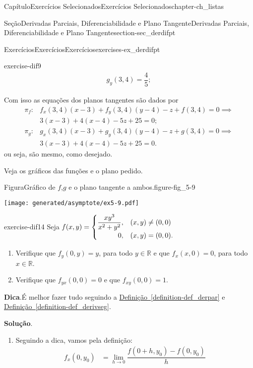 \documentclass[oneside,10pt,]{book}
\newcommand{\blocktitlefont}{\relax}
\newcommand{\xreffont}{\relax}
\numberwithin{equation}{section}
\newcommand{\R}{\mathbb R}
\begin{document}
\begin{chapterptx}{Capítulo}{Exercícios Selecionados}{}{Exercícios Selecionados}{}{}{chapter-ch_listas}
\begin{sectionptx}{Seção}{Derivadas Parciais, Diferenciabilidade e Plano Tangente}{}{Derivadas Parciais, Diferenciabilidade e Plano Tangente}{}{}{section-sec_derdifpt}
\begin{exercises-subsection-numberless}{Exercícios}{Exercícios}{}{Exercícios}{}{}{exercises-ex_derdifpt}
\begin{divisionexercise}{9}{}{}{exercise-dif9}
\begin{align*}
g_y(3,4)=\dfrac{4}{5};
\end{align*}
%
\par
Com isso as equações dos planos tangentes são dados por%
\begin{align*}
\pi_f\colon&
f_x(3,4)(x-3)+f_y(3,4)(y-4)-z+f(3,4)=0\implies\\
&\boxed{3(x-3)+4(x-4)-5z+25=0};\\
\pi_g\colon&
g_x(3,4)(x-3)+g_y(3,4)(y-4)-z+g(3,4)=0\implies\\
&\boxed{3(x-3)+4(x-4)-5z+25=0}.
\end{align*}
ou seja, são mesmo, como desejado.%
\par
Veja os gráficos das funções e o plano pedido. \begin{figureptx}{Figura}{Gráfico de \(f\),\(g\) e o plano tangente a ambos.}{figure-fig_5-9}{}%
\begin{image}{0.25}{0.5}{0.25}{}%
\texttt{[image: generated/asymptote/ex5-9.pdf]}
\end{image}%
\tcblower
\end{figureptx}%
%
\end{divisionexercise}%
\begin{divisionexercise}{14}{}{}{exercise-dif14}%
Seja \(f(x,y)=\begin{cases}
\dfrac{xy^3}{x^2+y^2},&(x,y)\neq(0,0)\\
\hfill 0,&(x,y)=(0,0).
\end{cases}\)%
\begin{enumerate}[label=\alph*]
\item{}Verifique que \(f_y(0,y)=y\), para todo \(y\in\R\) e que \(f_x(x,0)=0\), para todo \(x\in\R\).%
\item{}Verifique que \(f_{yx}(0,0)=0\) e que \(f_{xy}(0,0)=1\).%
\end{enumerate}
%
\par\smallskip%
\noindent\textbf{\blocktitlefont Dica}.\hypertarget{hint-dif14-b}{}\quad{}É melhor fazer tudo seguindo a \hyperref[definition-def_derpar]{Definição~{\xreffont\ref{definition-def_derpar}}} e \hyperref[definition-def_derivseg]{Definição~{\xreffont\ref{definition-def_derivseg}}}.%
\par\smallskip%
\noindent\textbf{\blocktitlefont Solução}.\hypertarget{solution-dif14-c}{}\quad{}%
\begin{enumerate}[label=\alph*]
\item{}Seguindo a dica, vamos pela definição:%
\begin{align*}
f_x(0,y_0)&
=\lim\limits_{h\to0}\dfrac{f(0+h,y_0)-f(0,y_0)}{h}

\end{align*}
\end{enumerate}
\end{divisionexercise}
\end{exercises-subsection-numberless}
\end{sectionptx}
\end{chapterptx}
\end{document}
